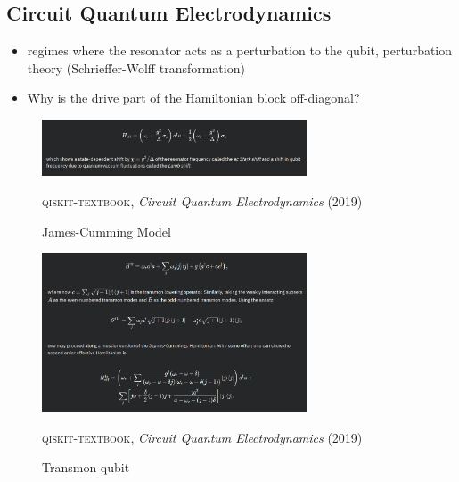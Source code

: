 \subsection{Circuit Quantum Electrodynamics}

\begin{itemize}
    \item regimes where the resonator acts as a perturbation to the qubit, perturbation theory (Schrieffer-Wolff transformation)
    \item Why is the drive part of the Hamiltonian block off-diagonal?
\end{itemize}


\begin{figure}[H]
    \centering
    \includegraphics[width=0.7\textwidth]{IMAGE/6_4_james_cumming.png}\\
    \caption{James-Cumming Model}
    \textsc{qiskit-textbook}, \emph{Circuit Quantum Electrodynamics} (2019)
    \label{fig:james}
\end{figure}


\begin{figure}[H]
    \centering
    \includegraphics[width=0.7\textwidth]{IMAGE/6_4_transmon.png}\\
    \caption{Transmon qubit}
    \textsc{qiskit-textbook}, \emph{Circuit Quantum Electrodynamics} (2019)
    \label{fig:transmon}
\end{figure}
